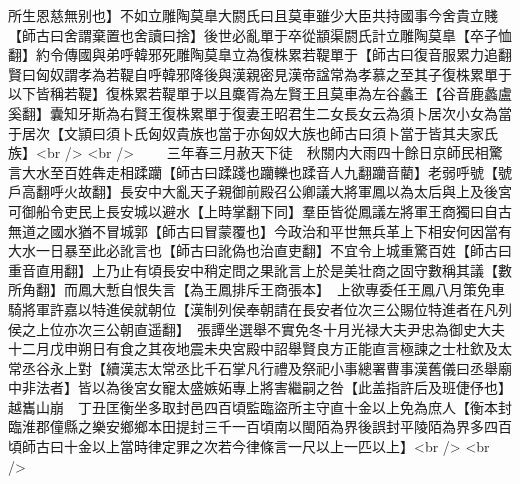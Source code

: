 所生恩慈無别也】不如立雕陶莫臯大閼氏曰且莫車雖少大臣共持國事今舍貴立賤【師古曰舍謂棄置也舍讀曰捨】後世必亂單于卒從顓渠閼氏計立雕陶莫臯【卒子恤翻】約令傳國與弟呼韓邪死雕陶莫臯立為復株累若鞮單于【師古曰復音服累力追翻賢曰匈奴謂孝為若鞮自呼韓邪降後與漢親密見漢帝諡常為孝慕之至其子復株累單于以下皆稱若鞮】復株累若鞮單于以且麋胥為左賢王且莫車為左谷蠡王【谷音鹿蠡盧奚翻】囊知牙斯為右賢王復株累單于復妻王昭君生二女長女云為須卜居次小女為當于居次【文頴曰須卜氏匈奴貴族也當于亦匈奴大族也師古曰須卜當于皆其夫家氏族】<br />
<br />
　　三年春三月赦天下徒　秋關内大雨四十餘日京師民相驚言大水至百姓犇走相蹂躪【師古曰蹂踐也躪轢也蹂音人九翻躪音藺】老弱呼號【號戶高翻呼火故翻】長安中大亂天子親御前殿召公卿議大將軍鳳以為太后與上及後宮可御船令吏民上長安城以避水【上時掌翻下同】羣臣皆從鳳議左將軍王商獨曰自古無道之國水猶不冒城郭【師古曰冒蒙覆也】今政治和平世無兵革上下相安何因當有大水一日暴至此必訛言也【師古曰訛偽也治直吏翻】不宜令上城重驚百姓【師古曰重音直用翻】上乃止有頃長安中稍定問之果訛言上於是美壮商之固守數稱其議【數所角翻】而鳳大慙自恨失言【為王鳳排斥王商張本】　上欲專委任王鳳八月策免車騎將軍許嘉以特進侯就朝位【漢制列侯奉朝請在長安者位次三公賜位特進者在凡列侯之上位亦次三公朝直遥翻】　張譚坐選舉不實免冬十月光禄大夫尹忠為御史大夫　十二月戊申朔日有食之其夜地震未央宮殿中詔舉賢良方正能直言極諫之士杜欽及太常丞谷永上對【續漢志太常丞比千石掌凡行禮及祭祀小事總署曹事漢舊儀曰丞舉廟中非法者】皆以為後宮女寵太盛嫉妬專上將害繼嗣之咎【此盖指許后及班倢伃也】　越巂山崩　丁丑匡衡坐多取封邑四百頃監臨盜所主守直十金以上免為庶人【衡本封臨淮郡僮縣之樂安鄉鄉本田提封三千一百頃南以閩陌為界後誤封平陵陌為界多四百頃師古曰十金以上當時律定罪之次若今律條言一尺以上一匹以上】<br />
<br />
